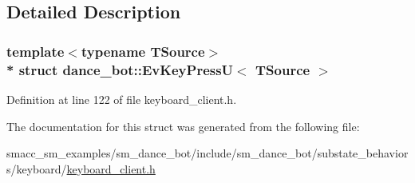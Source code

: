 \subsection{Detailed Description}
\subsubsection*{template$<$typename T\+Source$>$\\*
struct dance\+\_\+bot\+::\+Ev\+Key\+Press\+U$<$ T\+Source $>$}



Definition at line 122 of file keyboard\+\_\+client.\+h.



The documentation for this struct was generated from the following file\+:\begin{DoxyCompactItemize}
\item 
smacc\+\_\+sm\+\_\+examples/sm\+\_\+dance\+\_\+bot/include/sm\+\_\+dance\+\_\+bot/substate\+\_\+behaviors/keyboard/\hyperlink{keyboard__client_8h}{keyboard\+\_\+client.\+h}\end{DoxyCompactItemize}
